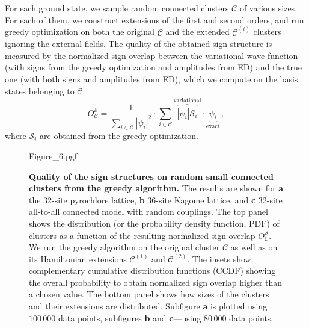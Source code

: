 For each ground state, we sample random connected clusters $\mathcal{C}$ of various sizes. For each of them, we construct extensions of the first and second orders, and run greedy optimization on both the original $\mathcal{C}$ and the extended $\mathcal{C}^{(i)}$ clusters ignoring the external fields. The quality of the obtained sign structure is measured by the normalized sign overlap between the variational wave function (with signs from the greedy optimization and amplitudes from ED) and the true one (with both signs and amplitudes from ED), which we compute on the basis states belonging to $\mathcal{C}$:
\begin{equation}
	O^\mathcal{S}_\mathcal{C} = \frac{1}{\sum_{i \in \mathcal{C}} |\psi_i|^2}
	\cdot \sum\limits_{i \in \mathcal{C}}
            \overbrace{|\psi_i|\mathcal{S}_i}^\text{variational}
            \cdot \underbrace{\psi_i}_\text{exact} \,,
\end{equation}
where $\mathcal{S}_i$ are obtained from the greedy optimization.

\begin{figure}[t]
    \centering
    {Figure_6.pgf}
    \caption{\label{fig:overlap_and_clusters}\textbf{Quality of the sign structures on random small connected clusters from the greedy algorithm.} The results are shown for \textbf{a} the 32-site pyrochlore lattice, \textbf{b} 36-site Kagome lattice, and \textbf{c} 32-site all-to-all connected model with random couplings. 
    The top panel shows the distribution (or the probability density function, PDF) of clusters as a function of the resulting normalized sign overlap $O^\mathcal{S}_\mathcal{C}$. We run the greedy algorithm on the original cluster $\mathcal{C}$ as well as on its Hamiltonian extensions $\mathcal{C}^{(1)}$ and $\mathcal{C}^{(2)}$. The insets show complementary cumulative distribution functions (CCDF) showing the overall probability to obtain normalized sign overlap higher than a chosen value. The bottom panel shows how sizes of the clusters and their extensions are distributed. Subfigure \textbf{a} is plotted using $100\,000$ data points, subfigures \textbf{b} and \textbf{c}---using $80\,000$ data points.}
\end{figure}

